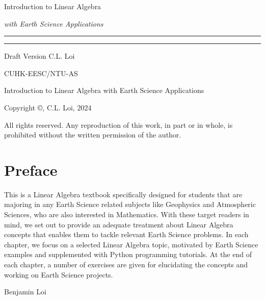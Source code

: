 \begin{titlepage}
    {\Huge\raggedright Introduction to Linear Algebra \par}
    {\Large\raggedright \textit{with Earth Science Applications} \hfill\textcolor{Mahogany}{\rule{3mm}{3mm}} \par}
    \vspace{3mm}\hrule\par
    {\Large\raggedleft Draft Version \hfill C.L. Loi \par}
    \vfill
    {\Large\raggedleft CUHK-EESC/NTU-AS \par}
\end{titlepage}
\begin{titlepage}
\begin{center}
Introduction to Linear Algebra with Earth Science Applications

Copyright ©, C.L. Loi, 2024 

All rights reserved. Any reproduction of this work, in part or in whole, is prohibited without the written permission of the author.
\end{center}
\end{titlepage}
\newpage


\chapter*{Preface}
This is a Linear Algebra textbook specifically designed for students that are majoring in any Earth Science related subjects like Geophysics and Atmospheric Sciences, who are also interested in Mathematics. With these target readers in mind, we set out to provide an adequate treatment about Linear Algebra concepts that enables them to tackle relevant Earth Science problems. In each chapter, we focus on a selected Linear Algebra topic, motivated by Earth Science examples and supplemented with Python programming tutorials. At the end of each chapter, a number of exercises are given for elucidating the concepts and working on Earth Science projects. \par
{\raggedleft Benjamin Loi \par}

\tableofcontents